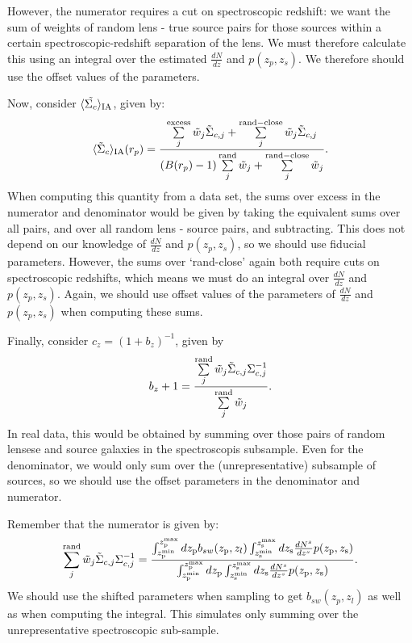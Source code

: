 \documentclass[onecolumn,amsmath,aps,fleqn, superscriptaddress]{revtex4}
\begin{document}
However, the numerator requires a cut on spectroscopic redshift: we want the sum of weights of random lens - true source pairs for those sources within a certain spectroscopic-redshift separation of the lens. We must therefore calculate this using an integral over the estimated $\frac{dN}{dz}$ and $p(z_p, z_s)$. We therefore should use the offset values of the parameters.

Now, consider $\langle \tilde{\Sigma_c}\rangle_{\rm IA}$, given by:
\begin{equation}
\langle \tilde{\Sigma}_c\rangle_{\rm IA} (r_p) = \frac{\sum\limits_{j}^{\rm excess} \tilde{w}_j \tilde{\Sigma}_{c,j}+ \sum\limits_{j}^{\rm rand-close} \tilde{w}_j \tilde{\Sigma}_{c,j}}{(B(r_p)-1)\sum\limits_{j}^{\rm rand} \tilde{w}_j + \sum\limits_{j}^{\rm rand-close} \tilde{w}_j}.
\label{SigmaIA}
\end{equation} 
When computing this quantity from a data set, the sums over excess in the numerator and denominator would be given by taking the equivalent sums over all pairs, and over all random lens - source pairs, and subtracting. This does not depend on our knowledge of $\frac{dN}{dz}$ and $p(z_p, z_s)$, so we should use fiducial parameters. However, the sums over `rand-close' again both require cuts on spectroscopic redshifts, which means we must do an integral over $\frac{dN}{dz}$ and $p(z_p, z_s)$. Again, we should use offset values of the parameters of $\frac{dN}{dz}$ and $p(z_p, z_s)$ when computing these sums.

Finally, consider $c_z = (1+b_z)^{-1}$, given by 
\begin{equation}
b_z+1 = \frac{\sum\limits^{\rm rand}_{j} \tilde{w}_j \tilde{\Sigma}_{c,j} \Sigma_{c,j}^{-1}}{\sum\limits^{\rm rand}_{j} \tilde{w}_j}.
\label{photozbias}
\end{equation}
In real data, this would be obtained by summing over those pairs of random lensese and source galaxies in the spectroscopis subsample. Even for the denominator, we would only sum over the (unrepresentative) subsample of sources, so we should use the offset parameters in the denominator and numerator. 

Remember that the numerator is given by:
\begin{equation}
\sum\limits^{\rm rand}_{j} \tilde{w}_j \tilde{\Sigma}_{c,j} \Sigma_{c,j}^{-1}  = \frac{\int_{z_{\rm p}^{\rm min}}^{z_{\rm p}^{\rm max}}dz_{\rm p} b_{sw}(z_{\rm p}, z_l) \int_{z_{\rm s}^{\rm min}}^{z_{\rm s}^{\rm max}}dz_{\rm s} \frac{dN^s}{dz^s} p(z_{\rm p}, z_{\rm s})}{\int_{z_{\rm p}^{\rm min}}^{z_{\rm p}^{\rm max}}dz_{\rm p}\int_{z_{\rm s}^{\rm min}}^{z_{\rm s}^{\rm max}}dz_{\rm s} \frac{dN^s}{dz^s} p(z_{\rm p}, z_{\rm s})}.
\label{photoz}
\end{equation}
We should use the shifted parameters when sampling to get $b_{sw}(z_p, z_l)$ as well as when computing the integral. This simulates only summing over the unrepresentative spectroscopic sub-sample.
\end{document}

